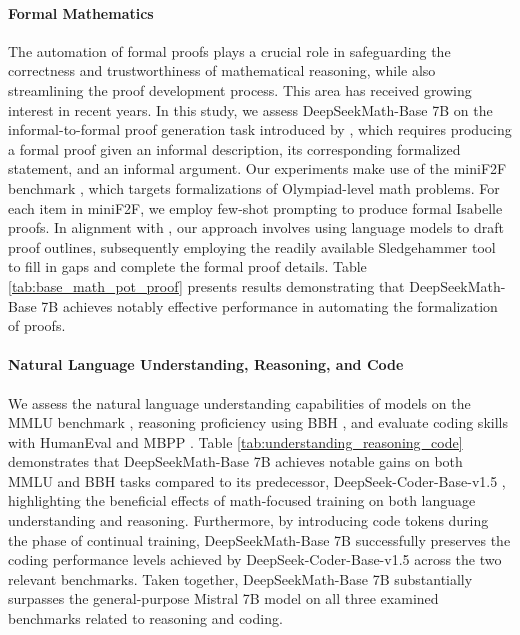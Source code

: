 \begin{itemize}[topsep=0pt]
\paragraph{Formal Mathematics}

The automation of formal proofs plays a crucial role in safeguarding the correctness and trustworthiness of mathematical reasoning, while also streamlining the proof development process. This area has received growing interest in recent years. In this study, we assess DeepSeekMath-Base 7B on the informal-to-formal proof generation task introduced by \citep{dsp_proof}, which requires producing a formal proof given an informal description, its corresponding formalized statement, and an informal argument. Our experiments make use of the miniF2F benchmark \citep{minif2f}, which targets formalizations of Olympiad-level math problems. For each item in miniF2F, we employ few-shot prompting to produce formal Isabelle proofs. In alignment with \cite{dsp_proof}, our approach involves using language models to draft proof outlines, subsequently employing the readily available Sledgehammer tool \citep{sledgehammer} to fill in gaps and complete the formal proof details. Table \ref{tab:base_math_pot_proof} presents results demonstrating that DeepSeekMath-Base 7B achieves notably effective performance in automating the formalization of proofs.

\paragraph{Natural Language Understanding, Reasoning, and Code}

We assess the natural language understanding capabilities of models on the MMLU benchmark \citep{mmlu}, reasoning proficiency using BBH \citep{bbh}, and evaluate coding skills with HumanEval \citep{codex} and MBPP \citep{mbpp}. Table \ref{tab:understanding_reasoning_code} demonstrates that DeepSeekMath-Base 7B achieves notable gains on both MMLU and BBH tasks compared to its predecessor, DeepSeek-Coder-Base-v1.5 \citep{deepseek-coder}, highlighting the beneficial effects of math-focused training on both language understanding and reasoning. Furthermore, by introducing code tokens during the phase of continual training, DeepSeekMath-Base 7B successfully preserves the coding performance levels achieved by DeepSeek-Coder-Base-v1.5 across the two relevant benchmarks. Taken together, DeepSeekMath-Base 7B substantially surpasses the general-purpose Mistral 7B model \citep{mistral} on all three examined benchmarks related to reasoning and coding.


\end{itemize}
